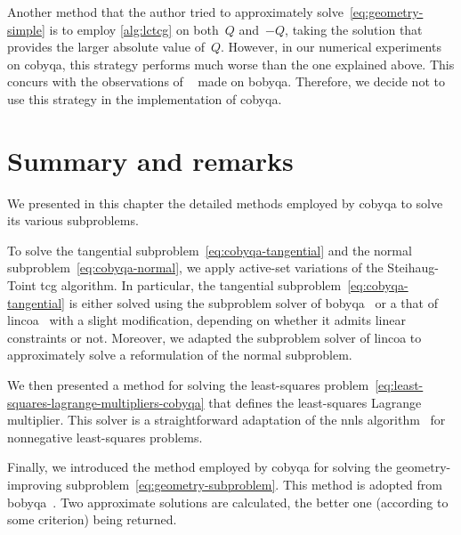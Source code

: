 Another method that the author tried to approximately solve~\cref{eq:geometry-simple} is to employ \cref{alg:lctcg} on both~$Q$ and~$-Q$, taking the solution that provides the larger absolute value of~$Q$.
However, in our numerical experiments on \gls{cobyqa}, this strategy performs much worse than the one explained above.
This concurs with the observations of \citeauthor{Powell_2008}~\cite{Powell_2008} made on \gls{bobyqa}.
Therefore, we decide not to use this strategy in the implementation of \gls{cobyqa}.

\section{Summary and remarks}

We presented in this chapter the detailed methods employed by \gls{cobyqa} to solve its various subproblems.

To solve the tangential subproblem~\cref{eq:cobyqa-tangential} and the normal subproblem~\cref{eq:cobyqa-normal}, we apply active-set variations of the Steihaug-Toint \gls{tcg} algorithm.
In particular, the tangential subproblem~\cref{eq:cobyqa-tangential} is either solved using the subproblem solver of \gls{bobyqa}~\cite{Powell_2009} or a that of \gls{lincoa}~\cite{Powell_2015} with a slight modification, depending on whether it admits linear constraints or not.
Moreover, we adapted the subproblem solver of \gls{lincoa} to approximately solve a reformulation of the normal subproblem.

We then presented a method for solving the least-squares problem~\cref{eq:least-squares-lagrange-multipliers-cobyqa} that defines the least-squares Lagrange multiplier.
This solver is a straightforward adaptation of the \gls{nnls} algorithm~\cite[Alg.~23.10]{Lawson_Hanson_1987} for nonnegative least-squares problems.

Finally, we introduced the method employed by \gls{cobyqa} for solving the geometry-improving subproblem~\cref{eq:geometry-subproblem}.
This method is adopted from \gls{bobyqa}~\cite{Powell_2009}.
Two approximate solutions are calculated, the better one (according to some criterion) being returned.
